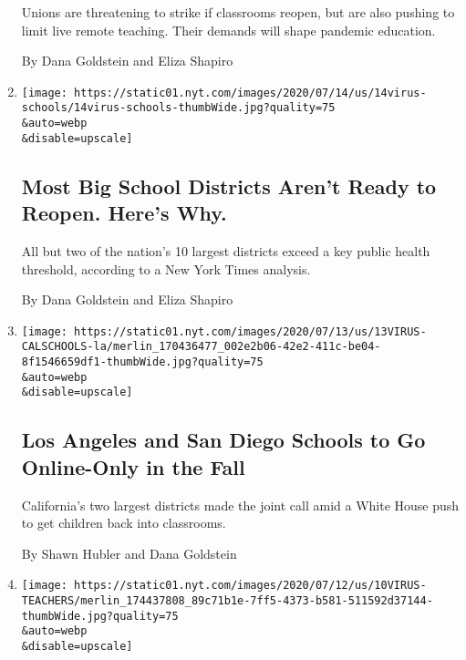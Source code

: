 \begin{enumerate}
  Unions are threatening to strike if classrooms reopen, but are also
  pushing to limit live remote teaching. Their demands will shape
  pandemic education.

  By Dana Goldstein and Eliza Shapiro
\item
  \href{/2020/07/14/us/coronavirus-schools-fall.html}{}

  \texttt{[image: https://static01.nyt.com/images/2020/07/14/us/14virus-schools/14virus-schools-thumbWide.jpg?quality=75\\\&auto=webp\\\&disable=upscale]}

  \hypertarget{most-big-school-districts-arent-ready-to-reopen-heres-why}{%
  \subsection{Most Big School Districts Aren't Ready to Reopen. Here's
  Why.}\label{most-big-school-districts-arent-ready-to-reopen-heres-why}}

  All but two of the nation's 10 largest districts exceed a key public
  health threshold, according to a New York Times analysis.

  By Dana Goldstein and Eliza Shapiro
\item
  \href{/2020/07/13/us/lausd-san-diego-school-reopening.html}{}

  \texttt{[image: https://static01.nyt.com/images/2020/07/13/us/13VIRUS-CALSCHOOLS-la/merlin\_170436477\_002e2b06-42e2-411c-be04-8f1546659df1-thumbWide.jpg?quality=75\\\&auto=webp\\\&disable=upscale]}

  \hypertarget{los-angeles-and-san-diego-schools-to-go-online-only-in-the-fall}{%
  \subsection{Los Angeles and San Diego Schools to Go Online-Only in the
  Fall}\label{los-angeles-and-san-diego-schools-to-go-online-only-in-the-fall}}

  California's two largest districts made the joint call amid a White
  House push to get children back into classrooms.

  By Shawn Hubler and Dana Goldstein
\item
  \href{/2020/07/11/us/virus-teachers-classrooms.html}{}

  \texttt{[image: https://static01.nyt.com/images/2020/07/12/us/10VIRUS-TEACHERS/merlin\_174437808\_89c71b1e-7ff5-4373-b581-511592d37144-thumbWide.jpg?quality=75\\\&auto=webp\\\&disable=upscale]}


\end{enumerate}
